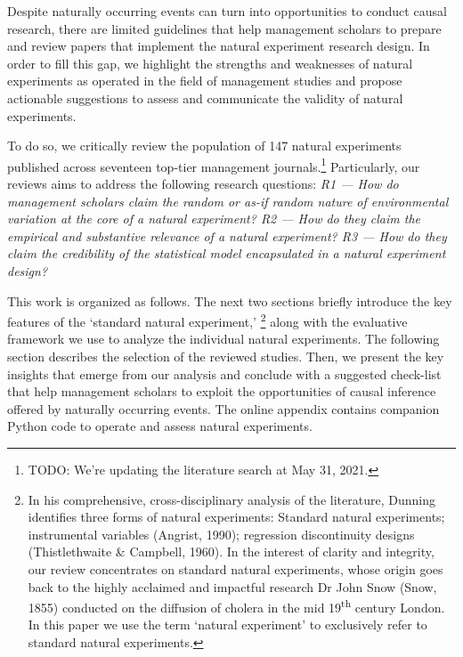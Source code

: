 \documentclass[nobib]{tufte-handout}
\newcommand{\todo}[1]{}
\renewcommand{\todo}[1]{{\color{red} TODO: {#1}}}
\begin{document}
\begin{refsection}
Despite naturally occurring events can turn into opportunities to conduct causal
research, there are limited guidelines that help management scholars to prepare
and review papers that implement the natural experiment research design. In
order to fill this gap, we highlight the strengths and weaknesses of natural
experiments as operated in the field of management studies and propose
actionable suggestions to assess and communicate the validity of natural
experiments.

To do so, we critically review the population of 147 natural experiments
published across seventeen top-tier management journals.\footnote{\todo{We're
updating the literature search at May 31, 2021.}} Particularly, our reviews aims
to address the following research questions: \emph{R1 --- How do management
scholars claim the random or as-if random nature of environmental variation at
the core of a natural experiment? R2 --- How do they claim the empirical and
substantive relevance of a natural experiment? R3 --- How do they claim the
credibility of the statistical model encapsulated in a natural experiment
design?}




This work is organized as follows. The next two sections briefly introduce the key
features of the `standard natural experiment,' \footnote{In his comprehensive,
    cross-disciplinary analysis of the literature, Dunning
    \citeyear[][]{Dunning2012} identifies
    three forms of natural experiments: Standard natural experiments;
    instrumental variables (Angrist, 1990); regression discontinuity designs
    (Thistlethwaite \& Campbell, 1960). In the interest of clarity and
    integrity, our review concentrates on standard natural experiments, whose
    origin goes back to the highly acclaimed and impactful research Dr John Snow
    (Snow, 1855) conducted on the diffusion of cholera in the mid
19\textsuperscript{th} century London. In this paper we use the term `natural
experiment' to exclusively refer to standard natural experiments.} along with the evaluative
framework we use to analyze the individual natural experiments. The following
section describes the selection of the reviewed studies. Then, we present the
key insights that emerge from our analysis and conclude with a suggested
check-list that help management scholars to exploit the opportunities of
causal inference offered by naturally occurring events. The online appendix
contains companion Python code to operate and assess natural experiments.


\end{refsection}
\end{document}
